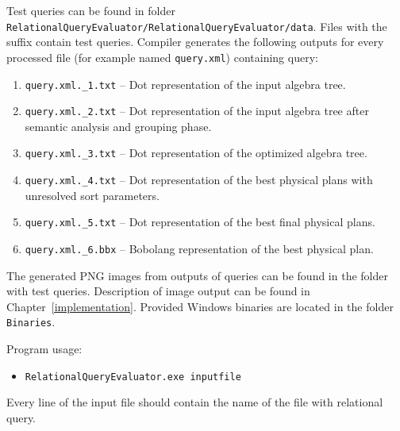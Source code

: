 \documentclass[12pt,a4paper]{report}
\let\openright=\clearpage
\begin{document}
Test queries can be found in folder \texttt{Relational\-Query\-Evaluator/\-Relational\-Query\-Evaluator/\-data}. Files with the suffix  contain test queries. Compiler generates the following outputs for every processed file (for example named \texttt{query.xml}) containing query:   
\begin{enumerate}
\item \texttt{query.xml.\_1.txt} -- Dot representation of the input algebra tree.
\item \texttt{query.xml.\_2.txt} --  Dot representation of the input algebra tree after semantic analysis and grouping phase.
\item \texttt{query.xml.\_3.txt} -- Dot representation of the optimized algebra tree.
\item \texttt{query.xml.\_4.txt} -- Dot representation of the best physical plans with unresolved sort parameters.
\item \texttt{query.xml.\_5.txt} -- Dot representation of the best final physical plans.
\item \texttt{query.xml.\_6.bbx} -- Bobolang representation of the best physical plan.
\end{enumerate}
The generated PNG images from outputs of queries can be found in the folder with test queries. Description of image output can be found in Chapter~\ref{implementation}.
Provided Windows binaries are located in the folder \texttt{Binaries}.

Program usage: 
\begin{itemize}
\item \texttt{RelationalQueryEvaluator.exe inputfile}
\end{itemize}
 Every line of the input file should contain the name of the file with relational query.




\openright
\end{document}
